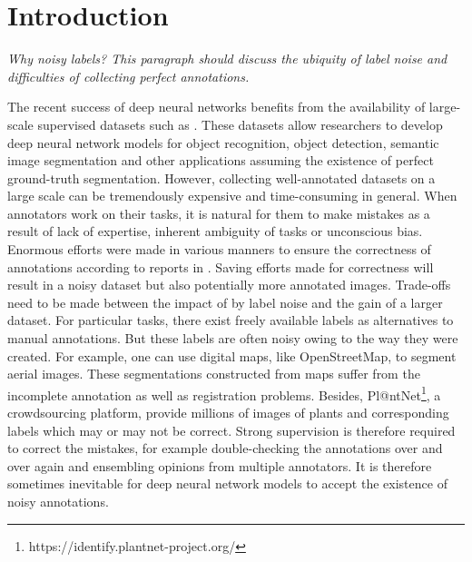 \section{Introduction}
\label{introduction}


\noindent
\textit{Why noisy labels?
This paragraph should discuss the ubiquity of label noise and difficulties of collecting perfect annotations.}

\noindent
The recent success of deep neural networks benefits from the availability of large-scale supervised datasets such as \cite{russakovsky2015imagenet,everingham2015pascal,mottaghi2014role,lin2014microsoft}.
These datasets allow researchers to develop deep neural network models for object recognition\cite{simonyan2014very}, object detection\cite{girshick2014rich}, semantic image segmentation\cite{long2015fully,zheng2015conditional} and other applications assuming the existence of perfect ground-truth segmentation.
However, collecting well-annotated datasets on a large scale can be tremendously expensive and time-consuming in general.
When annotators work on their tasks, it is natural for them to make mistakes as a result of lack of expertise, inherent ambiguity of tasks or unconscious bias.
Enormous efforts were made in various manners to ensure the correctness of annotations according to reports in \cite{russakovsky2015imagenet,lin2014microsoft}.
Saving efforts made for correctness will result in a noisy dataset but also potentially more annotated images.
Trade-offs need to be made between the impact of by label noise and the gain of a larger dataset.
For particular tasks, there exist freely available labels as alternatives to manual annotations.
But these labels are often noisy owing to the way they were created.
For example, one can use digital maps, like OpenStreetMap, to segment aerial images.
These segmentations constructed from maps suffer from the incomplete annotation as well as registration problems.\cite{mnih2012learning}
Besides, Pl@ntNet\footnote{https://identify.plantnet-project.org/}, a crowdsourcing platform, provide millions of images of plants and corresponding labels which may or may not be correct.
Strong supervision is therefore required to correct the mistakes, for example double-checking the annotations over and over again and ensembling opinions from multiple annotators.
It is therefore sometimes inevitable for deep neural network models to accept the existence of noisy annotations.


